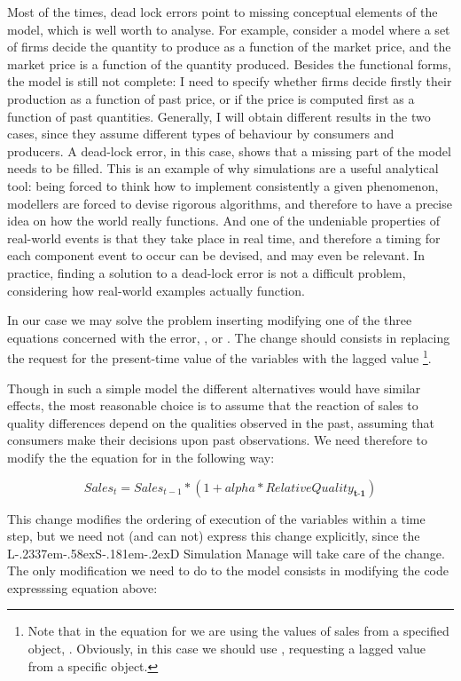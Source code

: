 \documentclass [11pt,a4paper] {book}
\def\LsD{{L\kern-.2337em\lower-.58ex\hbox{S}\kern-.181em\lower-.2ex\hbox{D}}\xspace}
\begin{document}
Most of the times, dead lock errors point to missing conceptual elements of the model,
which is well worth to analyse. For example, consider a model where a set of firms decide
the quantity to produce as a function of the market price, and the market price is a
function of the quantity produced. Besides the functional forms, the model is still not
complete: I need to specify whether firms decide firstly their production as a function
of past price, or if the price is computed first as a function of past quantities.
Generally, I will obtain different results in the two cases, since they assume different
types of behaviour by consumers and producers. A dead-lock error, in this case, shows that a missing part of the
model needs to be filled. This is an example of why simulations are a useful analytical
tool: being forced to think how to implement consistently a given phenomenon, modellers are forced to
devise rigorous algorithms, and therefore to have a precise idea on how the world really
functions. And one of the undeniable properties of real-world events is that they take place in real time, and therefore a timing for each component event to occur can be devised, and may even be relevant. In practice, finding a solution to a dead-lock error is not a difficult problem, considering how real-world examples actually function. 

In our case we may solve the problem inserting modifying one of the three equations concerned with the error, ,  or . The change should consists in replacing the request for the present-time value of the variables  with the lagged value \footnote{Note that in the equation for  we are using the values of sales from a specified object, . Obviously, in this case we should use , requesting a lagged value from a specific object.}.


Though in such a simple model the different alternatives would have similar effects, the most reasonable choice is to assume that the reaction of sales to quality differences depend on the qualities observed in the past, assuming that consumers make their decisions upon past observations. We need therefore to modify the the equation for  in the following way:

\[
Sales_t=Sales_{t-1}*(1+alpha*RelativeQuality_{\textbf{t-1}})
\]


This change modifies the ordering of execution of the variables within a time step, but we need not (and can not) express this change explicitly, since the \LsD Simulation Manage will take care of the change. The only modification we need to do to the model consists in modifying the code expresssing equation above:
\end{document}

